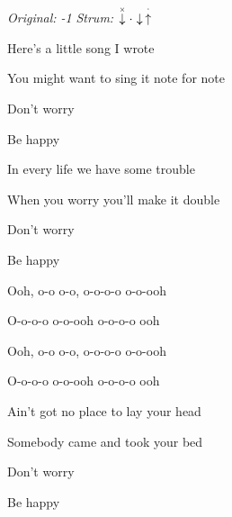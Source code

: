 \begin{song}


\begin{headerbox}
\RaiseBoxWithAccents
{} \quad
\textit{Original: -1} \quad
\textit{Strum:} $\ChuckDown\Miss\Down\StaccatoUp$ 
\end{headerbox}


\begin{strumbox}
\end{strumbox}

\bigskip

\Large

 Here's a little song I wrote \par
You might want to sing it note for note \par
Don't worry \par
Be happy \par

\bigskip

 In every life we have some trouble \par
{} When you worry you'll make it double \par
Don't worry \par
Be happy  \par

\bigskip

\begin{chorusboxwide}{\Chorus}
Ooh, o-o o-o, o-o-o-o o-o-ooh  \par
O-o-o-o o-o-ooh  o-o-o-o ooh  \par
{}Ooh, o-o o-o, o-o-o-o o-o-ooh  \par
O-o-o-o o-o-ooh  o-o-o-o ooh  \par
\end{chorusboxwide}

\bigskip

 Ain't got no place to lay your head \par
{} Somebody came and took your bed \par
Don't worry \par
Be happy \par


\end{song}
